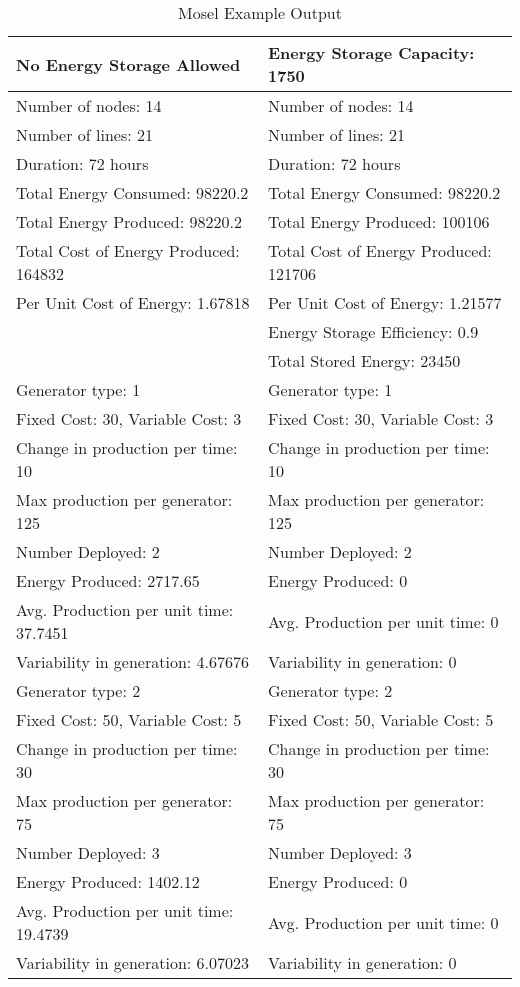 \begin{longtable}{ |  l  |  l  | }
\caption[Mosel Example Output]{Mosel Example Output}  \\
\hline
No Energy Storage Allowed &  Energy Storage Capacity: 1750 \\
\hline
Number of nodes: 14 & Number of nodes: 14 \\
Number of lines: 21 & Number of lines: 21 \\
Duration: 72 hours & Duration: 72 hours \\
\hline
Total Energy Consumed: 98220.2  &  Total Energy Consumed: 98220.2 \\
Total Energy Produced: 98220.2  &  Total Energy Produced: 100106  \\
Total Cost of Energy Produced: 164832  &  Total Cost of Energy Produced: 121706  \\
Per Unit Cost of Energy: 1.67818  &  Per Unit Cost of Energy: 1.21577 \\
  &  Energy Storage Efficiency: 0.9 \\ 
  &  Total Stored Energy: 23450 \\
\hline
	
Generator type: 1			&	Generator type: 1		\\
\hline
Fixed Cost: 30, Variable Cost: 3	&	Fixed Cost: 30, Variable Cost: 3	\\
Change in production per time: 10	&	Change in production per time: 10	\\
Max production per generator: 125	&	Max production per generator: 125 	\\
Number Deployed: 2			&	Number Deployed: 2			\\
Energy Produced: 2717.65		&	Energy Produced: 0			\\
Avg. Production per unit time: 37.7451&	Avg. Production per unit time: 0	\\
Variability in generation: 4.67676	&	Variability in generation: 0 	\\

\hline
Generator type: 2			&	Generator type: 2	\\
\hline
Fixed Cost: 50, Variable Cost: 5	&	Fixed Cost: 50, Variable Cost: 5	\\
Change in production per time: 30	&	Change in production per time: 30	\\
Max production per generator: 75	&	Max production per generator: 75	\\
Number Deployed: 3			&	Number Deployed: 3	\\
Energy Produced: 1402.12		&	Energy Produced: 0	\\
Avg. Production per unit time: 19.4739&	Avg. Production per unit time: 0	\\
Variability in generation: 6.07023	&	Variability in generation: 0	\\


\end{longtable}
